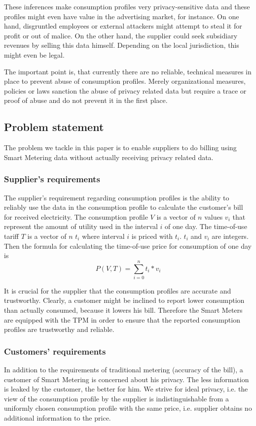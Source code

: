 \documentclass[english]{llncs}
\begin{document}
These inferences make consumption profiles very privacy-sensitive data and these profiles might even have value in the advertising market, for instance.
On one hand, disgruntled employees or external attackers might attempt to steal it for profit or out of malice.
On the other hand, the supplier could seek subsidiary revenues by selling this data himself.
Depending on the local jurisdiction, this might even be legal.

The important point is, that currently there are no reliable, technical measures in place to prevent abuse of consumption profiles.
Merely organizational measures, policies or laws sanction the abuse of privacy related data but require a trace or proof of abuse and do not prevent it in the first place.


\subsection{Problem statement}
\label{problemstatement}

The problem we tackle in this paper is to enable suppliers to do billing using Smart Metering data without actually receiving privacy related data. 


\subsubsection{Supplier's requirements}
\label{supplier_req}
The supplier's requirement regarding consumption profiles is the ability to reliably use the data in the consumption profile to calculate the customer's bill for received electricity.
The consumption profile $V$ is a vector of $n$ values $v_i$ that represent the amount of utility used in the interval $i$ of one day.
The time-of-use tariff $T$ is a vector of $n$ $t_i$ where interval $i$ is priced with $t_i$. $t_i$ and $v_i$ are integers.  
Then the formula for calculating the time-of-use price for consumption of one day is
$$ P(V,T) = \sum_{i=0}^{n}{t_i * v_i} $$

It is crucial for the supplier that the consumption profiles are accurate and trustworthy.
Clearly, a customer might be inclined to report lower consumption than actually consumed, because it lowers his bill.
Therefore the Smart Meters are equipped with the TPM in order to ensure that the reported consumption profiles are trustworthy and reliable.

\subsubsection{Customers' requirements}
\label{customer_req}
In addition to the requirements of traditional metering (accuracy of the bill), a customer of Smart Metering is concerned about his privacy.
The less information is leaked by the customer, the better for him.
We strive for ideal privacy, i.e. the view of the consumption profile by the supplier is indistinguishable from a uniformly chosen consumption profile with the same price, i.e. supplier obtains no additional information to the price.
\end{document}
